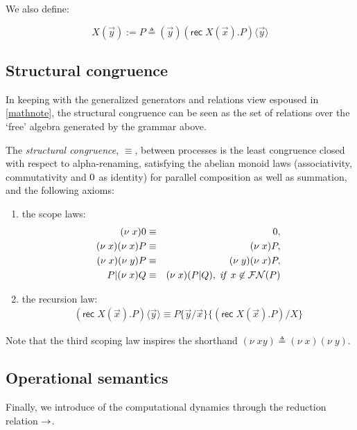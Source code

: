 \documentclass[]{llncs}
\begin{document}
We also define: 

\begin{equation}
  X(\vec{y}) := P \triangleq (\vec{y})(\textsf{rec} \; X(\vec{x}).P)\langle \vec{y} \rangle
\end{equation}

\subsection{Structural congruence}

In keeping with the generalized generators and relations
view espoused in \ref{mathnote}, the
structural congruence can be seen as the set of relations over the
`free' algebra generated by the grammar above.

\begin{definition}
  The {\em structural congruence}, $\equiv$, between processes is the
  least congruence closed with respect to alpha-renaming, satisfying
  the abelian monoid laws (associativity, commutativity and $\mathbin{0}$
  as identity) for parallel composition as well as summation, and the
  following axioms:
\begin{enumerate}
\item the scope laws:
\begin{eqnarray}
 (\nu \; x)\mathbin{0}  & \equiv & \mathbin{0}, \nonumber\\
 (\nu \; x)(\nu \; x)P & \equiv & (\nu \; x)P, \nonumber\\
 (\nu \; x)(\nu \; y)P & \equiv & (\nu \; y)(\nu \; x)P, \nonumber\\
 P | (\nu \; x)Q & \equiv & (\nu \; x)(P|Q), \; \mbox{\textit{if} }x \not\in \mathbin{\mathcal{FN}(P)} \nonumber
\end{eqnarray}
\item
the recursion law:
\begin{eqnarray}
  (\textsf{rec} \; X(\vec{x}).P)\langle \vec{y} \rangle \equiv P\{\vec{y}/\vec{x}\}\{(\textsf{rec} \; X(\vec{x}).P)/X\} \nonumber
\end{eqnarray}
\end{enumerate}
\end{definition}

Note that the third scoping law inspires the
shorthand $(\nu\; xy)\triangleq  (\nu \; x)(\nu \;
y)$.
\subsection{Operational semantics} 

Finally, we introduce of the computational dynamics through the
reduction relation $\rightarrow$.
\end{document}
